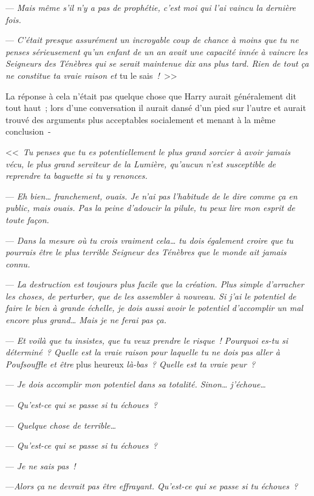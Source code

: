 --- \emph{Mais même s'il n'y a pas de prophétie, c'est moi qui l'ai vaincu la dernière fois.}

--- \emph{C'était presque assurément un incroyable coup de chance à moins que tu ne penses sérieusement qu'un enfant de un an avait une capacité innée à vaincre les Seigneurs des Ténèbres qui se serait maintenue dix ans plus tard. Rien de tout ça ne constitue ta vraie raison et} tu le sais\emph{~!}~>>

La réponse à cela n'était pas quelque chose que Harry aurait généralement dit tout haut~; lors d'une conversation il aurait dansé d'un pied sur l'autre et aurait trouvé des arguments plus acceptables socialement et menant à la même conclusion~-

<<~\emph{Tu penses que tu es potentiellement le plus grand sorcier à avoir jamais vécu, le plus grand serviteur de la Lumière, qu'aucun n'est susceptible de reprendre ta baguette si tu y renonces.}

--- \emph{Eh bien… franchement, ouais. Je n'ai pas l'habitude de le dire comme ça en public, mais ouais. Pas la peine d'adoucir la pilule, tu peux lire mon esprit de toute façon.}

--- \emph{Dans la mesure où tu crois vraiment cela… tu dois également croire que tu pourrais être le plus terrible Seigneur des Ténèbres que le monde ait jamais connu.}

--- \emph{La destruction est toujours plus facile que la création. Plus simple d'arracher les choses, de perturber, que de les assembler à nouveau. Si j'ai le potentiel de faire le bien à grande échelle, je dois aussi avoir le potentiel d'accomplir un mal encore plus grand… Mais je ne ferai pas ça.}

--- \emph{Et voilà que tu insistes, que tu veux prendre le risque~! Pourquoi es-tu si déterminé~? Quelle est la vraie raison pour laquelle tu ne dois pas aller à Poufsouffle et être} plus heureux \emph{là-bas~? Quelle est ta vraie peur~?}

--- \emph{Je dois accomplir mon potentiel dans sa totalité. Sinon… j'échoue…}

--- \emph{Qu'est-ce qui se passe si tu échoues~?}

--- \emph{Quelque chose de terrible…}

--- \emph{Qu'est-ce qui se passe si tu échoues~?}

--- \emph{Je ne sais pas~!}

---\emph{Alors ça ne devrait pas être effrayant. Qu'est-ce qui se passe si tu échoues~?}

